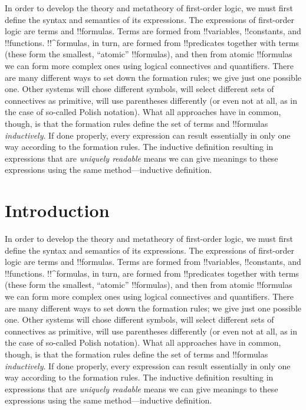 \documentclass[10pt,a4paper]{article}
\theoremstyle{plain}
\theoremstyle{definition}
\theoremstyle{remark}
\newcommand*{\olfileid}[3]{}
\newcommand*{\olsection}[1]{\section*{#1}}
\begin{document}
In order to develop the theory and metatheory of first-order logic, we
must first define the syntax and semantics of its expressions.  The
expressions of first-order logic are terms and !!{formula}s.  Terms
are formed from !!{variable}s, !!{constant}s, and !!{function}s.
!!^{formula}s, in turn, are formed from !!{predicate}s together with
terms (these form the smallest, ``atomic'' !!{formula}s), and then
from atomic !!{formula}s we can form more complex ones using logical
connectives and quantifiers.  There are many different ways to set
down the formation rules; we give just one possible one. Other systems
will chose different symbols, will select different sets of
connectives as primitive, will use parentheses differently (or even not
at all, as in the case of so-called Polish notation).  What all
approaches have in common, though, is that the formation rules define
the set of terms and !!{formula}s \emph{inductively}. If done
properly, every expression can result essentially in only one way
according to the formation rules.  The inductive definition resulting
in expressions that are \emph{uniquely readable} means we can give
meanings to these expressions using the same method---inductive
definition.





\olfileid{fol}{syn}{int}

\olsection{Introduction}

In order to develop the theory and metatheory of first-order logic, we
must first define the syntax and semantics of its expressions.  The
expressions of first-order logic are terms and !!{formula}s.  Terms
are formed from !!{variable}s, !!{constant}s, and !!{function}s.
!!^{formula}s, in turn, are formed from !!{predicate}s together with
terms (these form the smallest, ``atomic'' !!{formula}s), and then
from atomic !!{formula}s we can form more complex ones using logical
connectives and quantifiers.  There are many different ways to set
down the formation rules; we give just one possible one. Other systems
will chose different symbols, will select different sets of
connectives as primitive, will use parentheses differently (or even not
at all, as in the case of so-called Polish notation).  What all
approaches have in common, though, is that the formation rules define
the set of terms and !!{formula}s \emph{inductively}. If done
properly, every expression can result essentially in only one way
according to the formation rules.  The inductive definition resulting
in expressions that are \emph{uniquely readable} means we can give
meanings to these expressions using the same method---inductive
definition.
\end{document}
